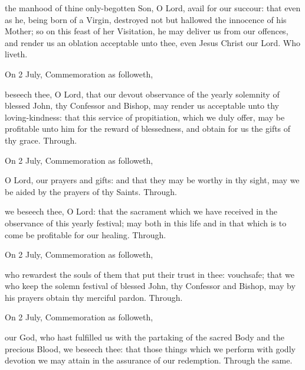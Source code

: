 \clearpage
{}

\secret
{} the manhood of thine only-begotten Son, O Lord, avail for our succour: that even as he, being born of a Virgin, destroyed not but hallowed the innocence of his Mother; so on this feast of her Visitation, he may deliver us from our offences, and render us an oblation acceptable unto thee, even Jesus Christ our Lord. Who liveth.

\begin{rubric}
	 On 2 July, Commemoration  as followeth,
\end{rubric}
 beseech thee, O Lord, that our devout observance of the yearly solemnity of blessed John, thy Confessor and Bishop, may render us acceptable unto thy loving-kindness: that this service of propitiation, which we duly offer, may be profitable unto him for the reward of blessedness, and obtain for us the gifts of thy grace. Through.

\begin{rubric}
	 On 2 July, Commemoration  as followeth,
\end{rubric}
 O Lord, our prayers and gifts: and that they may be worthy in thy sight, may we be aided by the prayers of thy Saints. Through.



\postcommunion
{} we beseech thee, O Lord: that the sacrament which we have received in the observance of this yearly festival; may both in this life and in that which is to come be profitable for our healing. Through.

\begin{rubric}
	 On 2 July, Commemoration  as followeth,
\end{rubric}
 who rewardest the souls of them that put their trust in thee: vouchsafe; that we who keep the solemn festival of blessed John, thy Confessor and Bishop, may by his prayers obtain thy merciful pardon. Through.

\begin{rubric}
	 On 2 July, Commemoration  as followeth,
\end{rubric}
 our God, who hast fulfilled us with the partaking of the sacred Body and the precious Blood, we beseech thee: that those things which we perform with godly devotion we may attain in the assurance of our redemption. Through the same.


